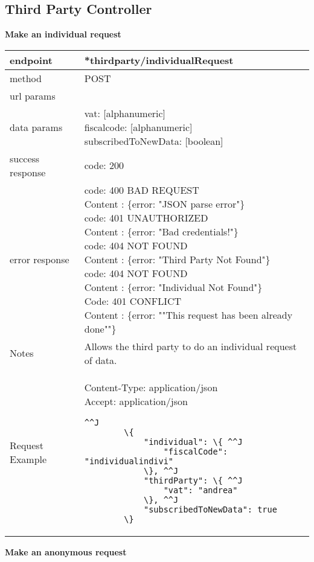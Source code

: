 \subsection{Third Party Controller}

\textbf{Make an individual request} \\

\begin{tabularx}{\linewidth}{| l| l }
	\hline
	endpoint & *thirdparty/individualRequest \\
	\hline
	method & POST \\
	\hline
	url params & \\
	\hline
	data params &
	\parbox{0.7\textwidth}{
		\bigskip
		vat: [alphanumeric]\\
		fiscalcode: [alphanumeric]\\
		subscribedToNewData: [boolean]
		\bigskip
	} \\
	\hline
	success response &
	\parbox{0.7\textwidth}{
		\bigskip
		code: 200
		\bigskip
	} \\
	\hline
	error response &
	\parbox{0.7\textwidth}{
		\bigskip
		code: 400 BAD REQUEST \\
		Content : \{error: "JSON parse error"\}\\
		code: 401 UNAUTHORIZED \\
		Content : \{error: "Bad credentials!"\}\\
		code: 404 NOT FOUND \\
		Content : \{error: "Third Party Not Found"\}\\
		code: 404 NOT FOUND \\
		Content : \{error: "Individual Not Found"\}\\
		Code: 401 CONFLICT \\
		Content : \{error: ""This request has been already done""\}\\
		\bigskip
	} \\
	\hline
	Notes & 
	\parbox{0.7\textwidth}{
		\bigskip Allows the third party to do an individual request of data.
	\bigskip}  \\
	\hline
		Request Example & 
		\parbox{0.8\textwidth}{
		\bigskip
		Content-Type: application/json \\
		Accept: application/json \\
		\bigskip
		\begin{lstlisting}^^J
		\{
			"individual": \{ ^^J
				"fiscalCode": "individualindivi"
			\}, ^^J
			"thirdParty": \{ ^^J
				"vat": "andrea"
			\}, ^^J
			"subscribedToNewData": true
		\}
	\end{lstlisting}
	} \\
	\hline
\end{tabularx}
\newpage
\textbf{Make an anonymous request} \\

